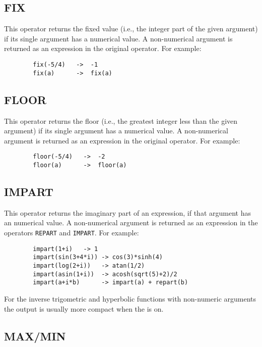 \subsection{FIX}
\hypertarget{operator:FIX}{}
This operator returns the fixed value (i.e., the integer part of
the given argument) if its single argument has a numerical value.  A
non-numerical argument is returned as an expression in the original
operator.  For example:

\begin{verbatim}
        fix(-5/4)   ->  -1
        fix(a)      ->  fix(a)
\end{verbatim}

\subsection{FLOOR}
\hypertarget{operator:FLOOR}{}
This operator returns the floor (i.e., the greatest integer less than
the given argument) if its single argument has a numerical value.  A
non-numerical argument is returned as an expression in the original
operator.  For example:

\begin{verbatim}
        floor(-5/4)   ->  -2
        floor(a)      ->  floor(a)
\end{verbatim}

\subsection{IMPART}
\hypertarget{operator:IMPART}{}
This operator returns the imaginary part of an expression, if that argument
has an numerical value.  A non-numerical argument is returned as an expression
in the operators \texttt{REPART} and \texttt{IMPART}.  For example:
\begin{verbatim}
        impart(1+i)   -> 1
        impart(sin(3+4*i)) -> cos(3)*sinh(4)
        impart(log(2+i))   -> atan(1/2)
        impart(asin(1+i))  -> acosh(sqrt(5)+2)/2
        impart(a+i*b)      -> impart(a) + repart(b)
\end{verbatim}

For the inverse trigometric and hyperbolic functions with non-numeric arguments the output is usually more compact when the  is on.

\subsection{MAX/MIN}
\hypertarget{operator:MAX}{}
\hypertarget{operator:MIN}{}

